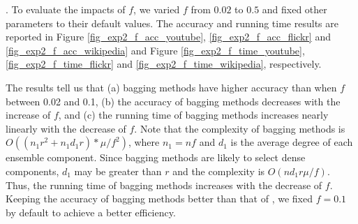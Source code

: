 . To evaluate the impacts of $f$, we
varied $f$ from $0.02$ to $0.5$ and fixed other parameters to their
default values. The accuracy and running time results are reported in
Figure \ref{fig_exp2_f_acc_youtube}, \ref{fig_exp2_f_acc_flickr} and
\ref{fig_exp2_f_acc_wikipedia} and Figure \ref{fig_exp2_f_time_youtube},
\ref{fig_exp2_f_time_flickr} and \ref{fig_exp2_f_time_wikipedia}, respectively.



The results tell us that (a) bagging methods have higher accuracy
than \NMF when $f$ between 0.02 and 0.1, (b) the accuracy of bagging methods decreases
with the increase of $f$, and (c) the running time of bagging methods increases
nearly linearly with the decrease of $f$. Note that the complexity of bagging methods is
$O((n_{1}r^2 + n_{1}d_{1}r)*\mu /f^2)$, where $n_1 = nf$ and $d_1$ is the average degree of
each ensemble component. Since bagging methods are likely to select dense components, $d_1$
may be greater than $r$ and the complexity is $O(nd_1r\mu /f)$. Thus, the running time
of bagging methods increases with the decrease of $f$. Keeping the accuracy of bagging
methods better than that of \NMF, we fixed $f = 0.1$ by default to achieve a better efficiency.

